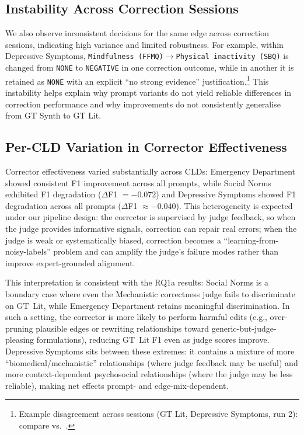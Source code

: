 \subsection{Instability Across Correction Sessions}
We also observe inconsistent decisions for the same edge across correction sessions, indicating high variance and limited robustness. For example, within Depressive Symptoms, \texttt{Mindfulness (FFMQ)}$\rightarrow$\texttt{Physical inactivity (SBQ)} is changed from \texttt{NONE} to \texttt{NEGATIVE} in one correction outcome, while in another it is retained as \texttt{NONE} with an explicit ``no strong evidence'' justification.\footnote{Example disagreement across sessions (GT Lit, Depressive Symptoms, run 2): compare  vs.\ .}%
This instability helps explain why prompt variants do not yield reliable differences in correction performance and why improvements do not consistently generalise from GT Synth to GT Lit.

\subsection{Per-CLD Variation in Corrector Effectiveness}

Corrector effectiveness varied substantially across CLDs: Emergency Department showed consistent F1 improvement across all prompts, while Social Norms exhibited F1 degradation ($\Delta$F1 $= -0.072$) and Depressive Symptoms showed F1 degradation across all prompts ($\Delta$F1 $\approx -0.040$). This heterogeneity is expected under our pipeline design: the corrector is supervised by judge feedback, so when the judge provides informative signals, correction can repair real errors; when the judge is weak or systematically biased, correction becomes a ``learning-from-noisy-labels'' problem and can amplify the judge's failure modes rather than improve expert-grounded alignment.

This interpretation is consistent with the RQ1a results: Social Norms is a boundary case where even the Mechanistic correctness judge fails to discriminate on GT~Lit, while Emergency Department retains meaningful discrimination. In such a setting, the corrector is more likely to perform harmful edits (e.g., over-pruning plausible edges or rewriting relationships toward generic-but-judge-pleasing formulations), reducing GT~Lit F1 even as judge scores improve. Depressive Symptoms sits between these extremes: it contains a mixture of more ``biomedical/mechanistic'' relationships (where judge feedback may be useful) and more context-dependent psychosocial relationships (where the judge may be less reliable), making net effects prompt- and edge-mix-dependent.

